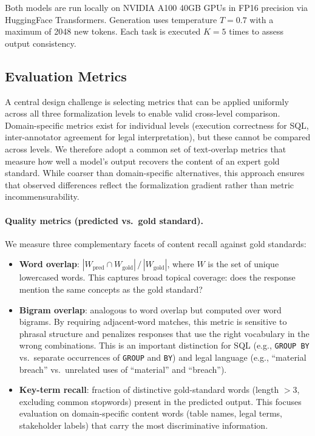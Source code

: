 \documentclass[runningheads]{llncs}
\begin{document}
Both models are run locally on NVIDIA A100 40GB GPUs in FP16 precision via HuggingFace Transformers. Generation uses temperature $T\!=\!0.7$ with a maximum of 2048 new tokens. Each task is executed $K\!=\!5$ times to assess output consistency.

\subsection{Evaluation Metrics}
\label{sec:metrics}

A central design challenge is selecting metrics that can be applied uniformly across all three formalization levels to enable valid cross-level comparison. Domain-specific metrics exist for individual levels (execution correctness for SQL, inter-annotator agreement for legal interpretation), but these cannot be compared across levels. We therefore adopt a common set of text-overlap metrics that measure how well a model's output recovers the content of an expert gold standard. While coarser than domain-specific alternatives, this approach ensures that observed differences reflect the formalization gradient rather than metric incommensurability.

\paragraph{Quality metrics (predicted vs.\ gold standard).}
We measure three complementary facets of content recall against gold standards:

\begin{itemize}[noitemsep]
  \item \textbf{Word overlap}: $|W_{\text{pred}} \cap W_{\text{gold}}| \,/\, |W_{\text{gold}}|$, where $W$ is the set of unique lowercased words. This captures broad topical coverage: does the response mention the same concepts as the gold standard?
  \item \textbf{Bigram overlap}: analogous to word overlap but computed over word bigrams. By requiring adjacent-word matches, this metric is sensitive to phrasal structure and penalizes responses that use the right vocabulary in the wrong combinations. This is an important distinction for SQL (e.g., \texttt{GROUP BY} vs.\ separate occurrences of \texttt{GROUP} and \texttt{BY}) and legal language (e.g., ``material breach'' vs.\ unrelated uses of ``material'' and ``breach'').
  \item \textbf{Key-term recall}: fraction of distinctive gold-standard words (length $> 3$, excluding common stopwords) present in the predicted output. This focuses evaluation on domain-specific content words (table names, legal terms, stakeholder labels) that carry the most discriminative information.
\end{itemize}
\end{document}
